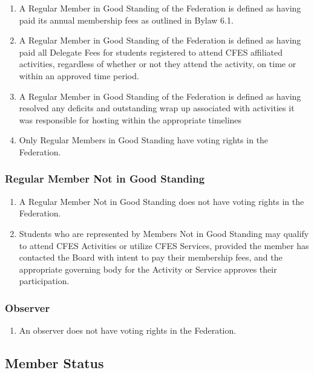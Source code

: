\begin{enumerate}
 \item
  A Regular Member in Good Standing of the Federation is defined as having paid its annual membership fees as outlined in Bylaw 6.1.
 \item
  A Regular Member in Good Standing of the Federation is defined as having paid all Delegate Fees for students registered to attend CFES affiliated activities, regardless of whether or not they attend the activity, on time or within an approved time period.
 \item
  A Regular Member in Good Standing of the Federation is defined as having resolved any deficits and outstanding wrap up associated with activities it was responsible for hosting within the appropriate timelines
 \item
  Only Regular Members in Good Standing have voting rights in the Federation.
\end{enumerate}

\subsubsection{Regular Member Not in Good Standing}
\label{regular-member-not-in-good-standing}

\begin{enumerate}
 \item
  A Regular Member Not in Good Standing does not have voting rights in the Federation.
 \item
  Students who are represented by Members Not in Good Standing may qualify to attend CFES Activities or utilize CFES Services, provided the member has contacted the Board with intent to pay their membership fees, and the appropriate governing body for the Activity or Service approves their participation.
\end{enumerate}

\subsubsection{Observer}
\label{observer}

\begin{enumerate}
 \item
  An observer does not have voting rights in the Federation.
\end{enumerate}

\subsection{Member Status}
\label{member-status}

